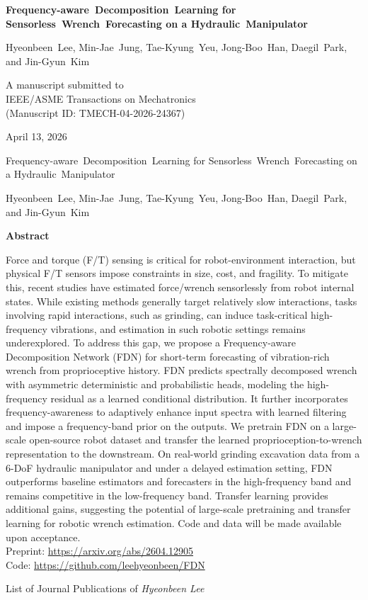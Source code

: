 \documentclass{article}
\newcommand{\fdntitle}{Frequency-aware~Decomposition~Learning for Sensorless~Wrench~Forecasting on a Hydraulic~Manipulator}
\newcommand{\fdnauthors}{Hyeonbeen~Lee, Min-Jae~Jung, Tae-Kyung~Yeu, Jong-Boo~Han, Daegil~Park, and Jin-Gyun~Kim}
\newcommand{\fdnvenue}{IEEE/ASME Transactions on Mechatronics}
\newcommand{\fdndate}{April 13, 2026}
\newcommand{\fdnabstract}{Force and torque (F/T) sensing is critical for robot-environment interaction, but physical F/T sensors impose constraints in size, cost, and fragility. To mitigate this, recent studies have estimated force/wrench sensorlessly from robot internal states. While existing methods generally target relatively slow interactions, tasks involving rapid interactions, such as grinding, can induce task-critical high-frequency vibrations, and estimation in such robotic settings remains underexplored. To address this gap, we propose a Frequency-aware Decomposition Network (FDN) for short-term forecasting of vibration-rich wrench from proprioceptive history. FDN predicts spectrally decomposed wrench with asymmetric deterministic and probabilistic heads, modeling the high-frequency residual as a learned conditional distribution. It further incorporates frequency-awareness to adaptively enhance input spectra with learned filtering and impose a frequency-band prior on the outputs. We pretrain FDN on a large-scale open-source robot dataset and transfer the learned proprioception-to-wrench representation to the downstream. On real-world grinding excavation data from a 6-DoF hydraulic manipulator and under a delayed estimation setting, FDN outperforms baseline estimators and forecasters in the high-frequency band and remains competitive in the low-frequency band. Transfer learning provides additional gains, suggesting the potential of large-scale pretraining and transfer learning for robotic wrench estimation. Code and data will be made available upon acceptance.}
\begin{document}
\begin{titlepage}
    \begin{center}
        \vspace*{1cm}
        \huge
        \textbf{\fdntitle{}}
            
        \vspace{1.5cm}
        
        \LARGE
        \fdnauthors
            
        \vfill
        
        \Large A manuscript submitted to \\
        \LARGE
        \fdnvenue{}\\
        \vspace{0.3cm}
        \large
        (Manuscript ID: TMECH-04-2026-24367)
            
        \vspace{0.8cm}
            
            
        \Large
        \fdndate
        \vspace*{1cm}
    \end{center}
\end{titlepage}

\thispagestyle{plain}
\vspace*{1.5cm}
\begin{center}
    \LARGE
    \fdntitle
    
    \Large
    \vspace{0.4cm}
    \fdnauthors
       
    \vspace{0.9cm}
    \textbf{Abstract}
\end{center}
\large
\fdnabstract{}
\vspace*{1cm}\\
Preprint: \href{https://arxiv.org/abs/2604.12905}{https://arxiv.org/abs/2604.12905}\\
Code: \href{https://github.com/leehyeonbeen/FDN}{https://github.com/leehyeonbeen/FDN}

\pagebreak

\vspace*{0.5cm}
\begin{center}
    \huge
    List of Journal Publications of \textsl{Hyeonbeen Lee}
\end{center}
\end{document}
